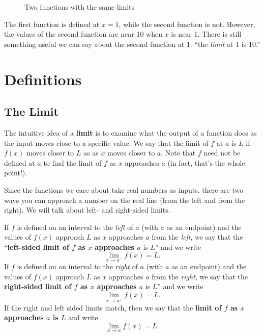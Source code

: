 \begin{figure}[h!]
{{

    }}
    \caption{Two functions with the same limits}
\end{figure}

The first function is defined at $x=1$, while the second function is not. However, the values of the second function are near 10 when $x$ is near 1. There is still something useful we can say about the second function at 1: ``the \textit{limit} at 1 is 10.''



\section{Definitions}

\subsection{The Limit}

The intuitive idea of a \textbf{limit} is to examine what the output of a function does as the input moves close to a specific value. We say that the limit of $f$ at $a$ is $L$ if $f(x)$ moves closer to $L$ as as $x$ moves closer to $a$. Note that $f$ need not be defined at $a$ to find the limit of $f$ as $x$ approaches $a$ (in fact, that's the whole point!).

Since the functions we care about take real numbers as inputs, there are two ways you can approach a number on the real line (from the left and from the right). We will talk about left- and right-sided limits.

If $f$ is defined on an interval to the \textit{left} of $a$ (with $a$ as an endpoint) and the values of $f(x)$ approach $L$ as $x$ approaches $a$ from the \textit{left}, we say that the ``\textbf{left-sided limit of $f$ as $x$ approaches $a$} is $L$'' and we write $$\lim_{x\to a^-}f(x)=L.$$
If $f$ is defined on an interval to the \textit{right} of $a$ (with $a$ as an endpoint) and the values of $f(x)$ approach $L$ as $x$ approaches $a$ from the \textit{right}, we say that the \textbf{right-sided limit of $f$ as $x$ approaches $a$} is $L$'' and we write
$$\lim_{x\to a^+}f(x)=L.$$
If the right and left sided limits match, then we say that the \textbf{limit of $f$ as $x$ approaches $a$ is $L$} and write $$\lim_{x\to a}f(x)=L.$$

